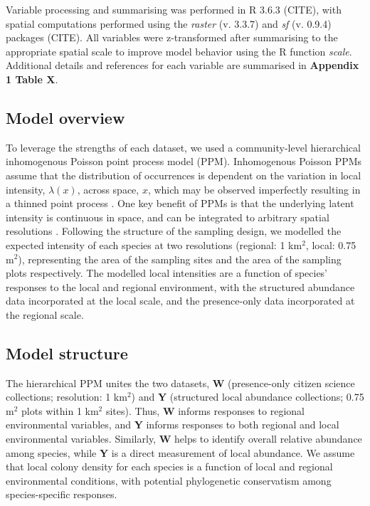\documentclass[preprint,review,times,12pt]{elsarticle}
\begin{document}
Variable processing and summarising was performed in R 3.6.3 (CITE), with spatial computations performed using the \emph{raster} (v. 3.3.7) and \emph{sf} (v. 0.9.4) packages (CITE). All variables were z-transformed after summarising to the appropriate spatial scale to improve model behavior using the R function \emph{scale}. Additional details and references for each variable are summarised in \textbf{Appendix 1 Table X}.


\subsection{Model overview}
To leverage the strengths of each dataset, we used a community-level hierarchical inhomogenous Poisson point process model (PPM). Inhomogenous Poisson PPMs assume that the distribution of occurrences is dependent on the variation in local intensity, $\lambda(x)$, across space, $x$, which may be observed imperfectly resulting in a thinned point process \citep{Baddeley2015}. One key benefit of PPMs is that the underlying latent intensity is continuous in space, and can be integrated to arbitrary spatial resolutions \citep{Renner2015,Hefley2016,Koshkina2017a}. Following the structure of the sampling design, we modelled the expected intensity of each species at two resolutions (regional: 1 km$^2$, local: 0.75 m$^2$), representing the area of the sampling sites and the area of the sampling plots respectively. The modelled local intensities are a function of species' responses to the local and regional environment, with the structured abundance data incorporated at the local scale, and the presence-only data incorporated at the regional scale. 


\subsection{Model structure}
The hierarchical PPM unites the two datasets, \textbf{W} (presence-only citizen science collections; resolution: 1 km$^2$) and \textbf{Y} (structured local abundance collections; 0.75 m$^2$ plots within 1 km$^2$ sites). Thus, \textbf{W} informs responses to regional environmental variables, and  \textbf{Y} informs responses to both regional and local environmental variables. Similarly, \textbf{W} helps to identify overall relative abundance among species, while \textbf{Y} is a direct measurement of local abundance. We assume that local colony density for each species is a function of local and regional environmental conditions, with potential phylogenetic conservatism among species-specific responses.
\end{document}
